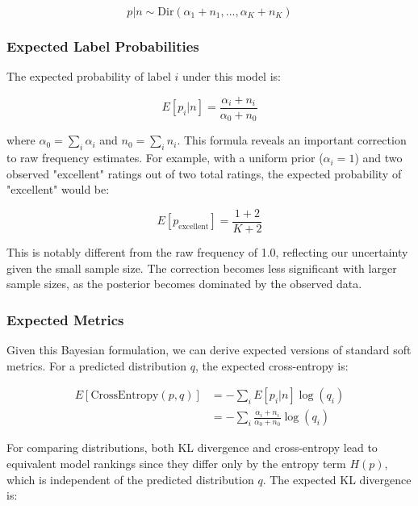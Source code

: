 \documentclass[journal]{IEEEtran}
\begin{document}
\begin{equation}
p|n \sim \text{Dir}(\alpha_1 + n_1, ..., \alpha_K + n_K)
\end{equation}

\subsubsection{Expected Label Probabilities}
The expected probability of label $i$ under this model is:

\begin{equation}
E[p_i|n] = \frac{\alpha_i + n_i}{\alpha_0 + n_0}
\end{equation}

where $\alpha_0 = \sum_i \alpha_i$ and $n_0 = \sum_i n_i$. This formula reveals an important correction to raw frequency estimates. For example, with a uniform prior ($\alpha_i = 1$) and two observed "excellent" ratings out of two total ratings, the expected probability of "excellent" would be:

\begin{equation}
E[p_\text{excellent}] = \frac{1 + 2}{K + 2}
\end{equation}

This is notably different from the raw frequency of 1.0, reflecting our uncertainty given the small sample size. The correction becomes less significant with larger sample sizes, as the posterior becomes dominated by the observed data.

\subsubsection{Expected Metrics}
Given this Bayesian formulation, we can derive expected versions of standard soft metrics. For a predicted distribution $q$, the expected cross-entropy is:

\begin{equation}
\begin{split}
E[\text{CrossEntropy}(p,q)] & = -\sum_i E[p_i|n]\log(q_i) \\
 & = -\sum_i \frac{\alpha_i + n_i}{\alpha_0 + n_0}\log(q_i)
\end{split}
\end{equation}

For comparing distributions, both KL divergence and cross-entropy lead to equivalent model rankings since they differ only by the entropy term $H(p)$, which is independent of the predicted distribution $q$. The expected KL divergence is:
\end{document}
